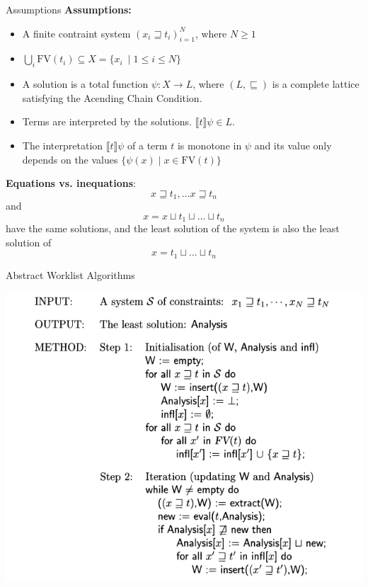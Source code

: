 \documentclass[aspectratio=1610, 13pt]{beamer}
\begin{document}
\begin{frame}{Assumptions}
\textbf{Assumptions:}
\begin{itemize}
\item A finite contraint system $(x_i \sqsupseteq t_i)_{i = 1}^N$, where $N \ge 1$
\item  $\bigcup_i\text{FV}(t_i) \subseteq X = \{x_i\ \mid  1 \le i \le N\}$
\item A solution is a total function $\psi: X \rightarrow L$, where $(L, \sqsubseteq)$ is a complete lattice satisfying the Acending Chain Condition.
\item Terms are interpreted by the solutions. $\llbracket t\rrbracket \psi\in L$.
\item The interpretation $\llbracket t\rrbracket \psi$ of a term $t$ is monotone in $\psi$ and its value only depends on the values $\{\psi(x) \mid x \in \text{FV}(t)\}$
\end{itemize}


\textbf{Equations vs. inequations}:
\[x \sqsupseteq t_1, \ldots x \sqsupseteq t_n\]
and 
\[x = x \sqcup t_1 \sqcup \ldots \sqcup t_n\]
have the same solutions, and the least solution of the system is also the least solution of 
\[x =  t_1 \sqcup \ldots \sqcup t_n\]
\end{frame}


\begin{frame}{Abstract Worklist Algorithms}
\begin{multicols}{2}
\includegraphics[scale=0.4]{absAlgo.png}

\end{multicols}
\end{frame}
\end{document}
